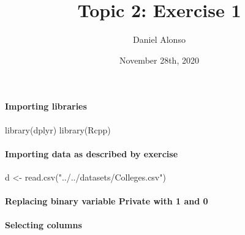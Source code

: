 \documentclass[
]{article}
\title{Topic 2: Exercise 1}
\author{Daniel Alonso}
\date{November 28th, 2020}
\newenvironment{Shaded}{\begin{snugshade}}{\end{snugshade}}
\newcommand{\DecValTok}[1]{\textcolor[rgb]{0.00,0.00,0.81}{#1}}
\newcommand{\FunctionTok}[1]{\textcolor[rgb]{0.00,0.00,0.00}{#1}}
\newcommand{\NormalTok}[1]{#1}
\newcommand{\OtherTok}[1]{\textcolor[rgb]{0.56,0.35,0.01}{#1}}
\newcommand{\SpecialCharTok}[1]{\textcolor[rgb]{0.00,0.00,0.00}{#1}}
\newcommand{\StringTok}[1]{\textcolor[rgb]{0.31,0.60,0.02}{#1}}
\begin{document}
\maketitle

\hypertarget{importing-libraries}{%
\paragraph{Importing libraries}\label{importing-libraries}}

\begin{Shaded}
\begin{Highlighting}[]
\FunctionTok{library}\NormalTok{(dplyr)}
\FunctionTok{library}\NormalTok{(Rcpp)}
\end{Highlighting}
\end{Shaded}

\hypertarget{importing-data-as-described-by-exercise}{%
\paragraph{Importing data as described by
exercise}\label{importing-data-as-described-by-exercise}}

\begin{Shaded}
\begin{Highlighting}[]
\NormalTok{d }\OtherTok{\textless{}{-}} \FunctionTok{read.csv}\NormalTok{(}\StringTok{"../../datasets/Colleges.csv"}\NormalTok{)}
\end{Highlighting}
\end{Shaded}

\hypertarget{replacing-binary-variable-private-with-1-and-0}{%
\paragraph{Replacing binary variable Private with 1 and
0}\label{replacing-binary-variable-private-with-1-and-0}}

\begin{Shaded}
\end{Shaded}

\hypertarget{selecting-columns}{%
\paragraph{Selecting columns}\label{selecting-columns}}
\end{document}
